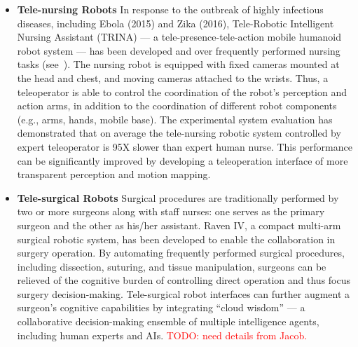 \begin{itemize}
\item \textbf{Tele-nursing Robots} In response to the outbreak of highly infectious diseases, including Ebola (2015) and Zika (2016), Tele-Robotic Intelligent Nursing Assistant (TRINA) --- a tele-presence-tele-action mobile humanoid robot system --- has been developed and over frequently performed nursing tasks (see~). The nursing robot is equipped with fixed cameras mounted at the head and chest, and moving cameras attached to the wrists. Thus, a teleoperator is able to control the coordination of the robot's perception and action arms, in addition to the coordination of different robot components (e.g., arms, hands, mobile base). The experimental system evaluation has demonstrated that on average the tele-nursing robotic system controlled by expert teleoperator is 95X slower than expert human nurse. This performance can be significantly improved by developing a teleoperation interface of more transparent perception and motion mapping. 


\item \textbf{Tele-surgical Robots} Surgical procedures are traditionally performed by two or more surgeons along with staff nurses: one serves as the primary surgeon and the other as his/her assistant. Raven IV, a compact multi-arm surgical robotic system, has been developed to enable the collaboration in surgery operation. By automating frequently performed surgical procedures, including dissection, suturing, and tissue manipulation, surgeons can be relieved of the cognitive burden of controlling direct operation and thus focus surgery decision-making. Tele-surgical robot interfaces can further augment a surgeon's cognitive capabilities by integrating ``cloud wisdom'' --- a collaborative decision-making ensemble of multiple intelligence agents, including human experts and AIs. \textcolor{red}{TODO: need details from Jacob.}





\end{itemize}
